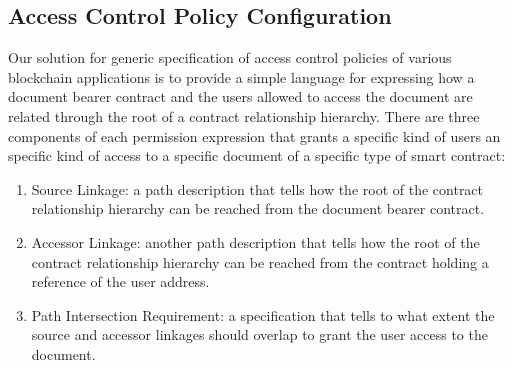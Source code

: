 \documentclass[conference]{IEEEtran}
\begin{document}
\subsection{Access Control Policy Configuration}
Our solution for generic specification of access control policies of various blockchain applications is to provide a simple language for expressing how a document bearer contract and the users allowed to access the document are related through the root of a contract relationship hierarchy. There are three components of each permission expression that grants a specific kind of users an specific kind of access to a specific document of a specific type of smart contract:
\begin{enumerate}
\item Source Linkage: a path description that tells how the root of the contract relationship hierarchy can be reached from the document bearer contract.
\item Accessor Linkage: another path description that tells how the root of the contract relationship hierarchy can be reached from the contract holding a reference of the user address.
\item Path Intersection Requirement: a specification that tells to what extent the source and accessor linkages should overlap to grant the user access to the document.     
\end{enumerate}            
\end{document}
